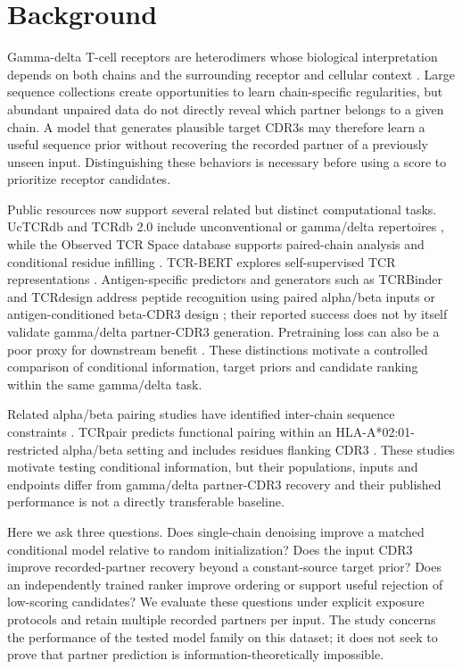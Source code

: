 \documentclass[10pt]{article}
\begin{document}
\section{Background}
Gamma-delta T-cell receptors are heterodimers whose biological interpretation
depends on both chains and the surrounding receptor and cellular context
\cite{gd_review}.
Large sequence collections create opportunities to learn chain-specific
regularities, but abundant unpaired data do not directly reveal which partner
belongs to a given chain. A model that generates plausible target CDR3s may
therefore learn a useful sequence prior without recovering the recorded partner
of a previously unseen input. Distinguishing these behaviors is necessary before
using a score to prioritize receptor candidates.

Public resources now support several related but distinct computational tasks.
UcTCRdb and TCRdb 2.0 include unconventional or gamma/delta repertoires
\cite{uctcrdb,tcrdb2}, while the Observed TCR Space database supports paired-chain
analysis and conditional residue infilling \cite{ots}. TCR-BERT explores
self-supervised TCR representations \cite{tcrbert}. Antigen-specific predictors
and generators such as TCRBinder and TCRdesign address peptide recognition using
paired alpha/beta inputs or antigen-conditioned beta-CDR3 design
\cite{tcrbinder,tcrdesign}; their reported
success does not by itself validate gamma/delta partner-CDR3 generation.
Pretraining loss can also be a poor proxy for downstream benefit
\cite{landry2025}. These distinctions motivate a controlled comparison of
conditional information, target priors and candidate ranking within the same
gamma/delta task.

Related alpha/beta pairing studies have identified inter-chain sequence
constraints \cite{pairing_constraints}. TCRpair predicts functional pairing
within an HLA-A*02:01-restricted alpha/beta setting and includes residues flanking
CDR3 \cite{tcrpair}. These studies motivate testing conditional information, but
their populations, inputs and endpoints differ from gamma/delta partner-CDR3
recovery and their published performance is not a directly transferable baseline.

Here we ask three questions. Does single-chain denoising improve a matched
conditional model relative to random initialization? Does the input CDR3 improve
recorded-partner recovery beyond a constant-source target prior? Does an
independently trained ranker improve ordering or support useful rejection of
low-scoring candidates? We evaluate these questions under explicit exposure
protocols and retain multiple recorded partners per input. The study concerns
the performance of the tested model family on this dataset; it does not seek to
prove that partner prediction is information-theoretically impossible.
\end{document}
